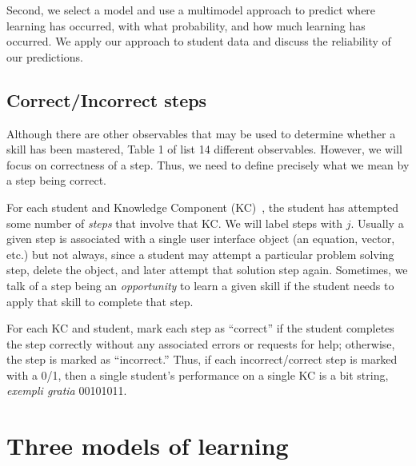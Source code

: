 \documentclass{acmlarge-edm}
\begin{document}
Second, we select a model and use a multimodel approach
to predict where learning has occurred, with what probability,
and how much learning has occurred.  We apply our approach
to student data and discuss the reliability of our predictions.


\subsection{Correct/Incorrect steps}

Although there are other observables that may be used
to determine whether a skill has been mastered, Table 1 of
\cite{baker_detecting_2010} list 14 different observables.  However, we 
will focus on correctness of a step.  Thus, we need to
define precisely what we mean by a step being correct.

For each student and Knowledge Component (KC)~\cite{vanlehn_behavior_2006}, 
the student has attempted some number of 
{\em steps} that involve that KC.   We will label
steps with $j$.  Usually a given step is associated
with a single user interface object (an equation, vector, etc.)  but
not always, since a student may attempt a particular problem solving
step, delete the object, and later attempt that solution step again.
Sometimes, we talk of a step being an {\em opportunity} to learn
a given skill if the student needs to apply that skill
to complete that step.

%
%

For each KC and student, mark each step as ``correct'' if
the student completes the step correctly without any associated errors or 
requests for help; otherwise, the step is marked as ``incorrect.''
\label{steps} 
%
Thus, if each incorrect/correct step is marked with a 0/1, then
a single student's performance on a single KC is a bit string,
{\em exempli gratia} 00101011.

\section{Three models of learning}
\end{document}
